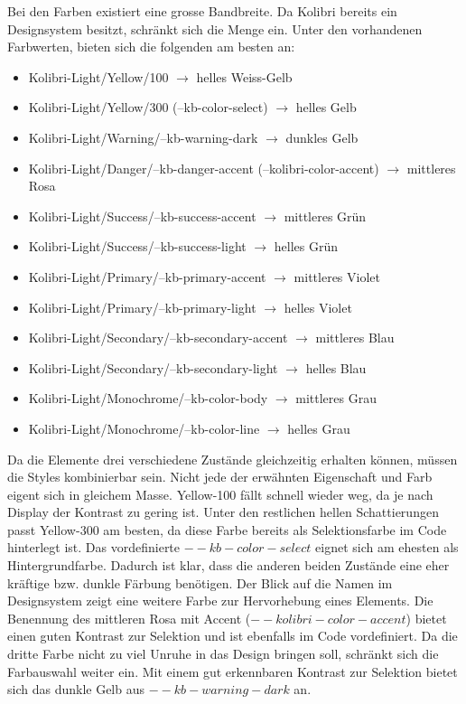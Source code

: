 Bei den Farben existiert eine grosse Bandbreite.
Da Kolibri bereits ein Designsystem besitzt, schränkt sich die Menge ein.
Unter den vorhandenen Farbwerten, bieten sich die folgenden am besten an:

\begin{itemize}
    \item Kolibri-Light/Yellow/100 $\rightarrow$ helles Weiss-Gelb
    \item Kolibri-Light/Yellow/300 (--kb-color-select) $\rightarrow$ helles Gelb
    \item Kolibri-Light/Warning/--kb-warning-dark $\rightarrow$ dunkles Gelb
    \item Kolibri-Light/Danger/--kb-danger-accent (--kolibri-color-accent) $\rightarrow$ mittleres Rosa
    \item Kolibri-Light/Success/--kb-success-accent $\rightarrow$ mittleres Grün
    \item Kolibri-Light/Success/--kb-success-light $\rightarrow$ helles Grün
    \item Kolibri-Light/Primary/--kb-primary-accent $\rightarrow$ mittleres Violet
    \item Kolibri-Light/Primary/--kb-primary-light $\rightarrow$ helles Violet
    \item Kolibri-Light/Secondary/--kb-secondary-accent $\rightarrow$ mittleres Blau
    \item Kolibri-Light/Secondary/--kb-secondary-light $\rightarrow$ helles Blau
    \item Kolibri-Light/Monochrome/--kb-color-body $\rightarrow$ mittleres Grau
    \item Kolibri-Light/Monochrome/--kb-color-line $\rightarrow$ helles Grau
\end{itemize}

Da die Elemente drei verschiedene Zustände gleichzeitig erhalten können, müssen die Styles kombinierbar sein.
Nicht jede der erwähnten Eigenschaft und Farb eigent sich in gleichem Masse.
Yellow-100 fällt schnell wieder weg, da je nach Display der Kontrast zu gering ist.
Unter den restlichen hellen Schattierungen passt Yellow-300 am besten, da diese Farbe bereits als Selektionsfarbe im Code hinterlegt ist.
Das vordefinierte $--kb-color-select$ eignet sich am ehesten als Hintergrundfarbe.
Dadurch ist klar, dass die anderen beiden Zustände eine eher kräftige bzw. dunkle Färbung benötigen.
Der Blick auf die Namen im Designsystem zeigt eine weitere Farbe zur Hervorhebung eines Elements.
Die Benennung des mittleren Rosa mit Accent ($--kolibri-color-accent$) bietet einen guten Kontrast zur Selektion und ist ebenfalls im Code vordefiniert.
Da die dritte Farbe nicht zu viel Unruhe in das Design bringen soll, schränkt sich die Farbauswahl weiter ein.
Mit einem gut erkennbaren Kontrast zur Selektion bietet sich das dunkle Gelb aus $--kb-warning-dark$ an.

